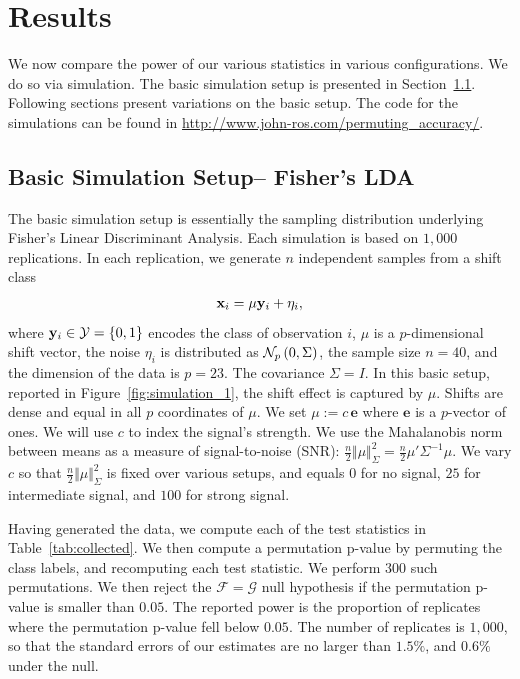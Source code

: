 \documentclass[]{bio}
\begin{document}
\section{Results}
\label{sec:results}
We now compare the power of our various statistics in various configurations. 
We do so via simulation.
The basic simulation setup is presented in Section~\ref{sec:simulation_details}.
Following sections present variations on the basic setup.
The \R code for the simulations can be found in \url{http://www.john-ros.com/permuting_accuracy/}.


\subsection{Basic Simulation Setup-- Fisher's LDA}
\label{sec:simulation_details}

The basic simulation setup is essentially the sampling distribution underlying Fisher's Linear Discriminant Analysis. 
Each simulation is based on $1,000$ replications. 
In each replication, we generate $n$ independent samples from a shift class 
\begin{align}
\label{eq:distribution}
\mathbf{x}_i = \mu \mathbf{y}_i + \eta_i,
\end{align}
where $\mathbf{y}_i \in \mathcal{Y}=\{ 0,1 \}$ encodes the class of observation $i$, $\mu$ is a $p$-dimensional shift vector, the noise $\eta_i$ is distributed as $\mathcal{N}_{p}\left(0,\Sigma\right)$, the sample size $n=40$, and the dimension of the data is $p=23$. 
The covariance $\Sigma=I$. 
In this basic setup, reported in Figure~\ref{fig:simulation_1}, the shift effect is captured by $\mu$. 
Shifts are dense and equal in all $p$ coordinates of $\mu$.
We set $\mu:=c \, \textbf{e}$ where $\textbf{e}$ is a $p$-vector of ones. 
We will use $c$ to index the signal's strength.
We use the Mahalanobis norm between means as a measure of signal-to-noise (SNR): 
$\frac{n}{2}\Vert \mu \Vert_\Sigma^2=\frac{n}{2} \mu' \Sigma^{-1} \mu$.
We vary $c$ so that $\frac{n}{2}\Vert \mu \Vert_\Sigma^2$ is fixed over various setups, and equals $0$ for no signal, $25$ for intermediate signal, and $100$ for strong signal.

Having generated the data, we compute each of the test statistics in Table~\ref{tab:collected}.
We then compute a permutation p-value by permuting the class labels, and recomputing each test statistic. 
We perform $300$ such permutations. 
We then reject the $\mathcal{F}=\mathcal{G}$ null hypothesis if the permutation p-value is smaller than $0.05$.
The reported power is the proportion of replicates where the permutation p-value fell below $0.05$.
The number of replicates is $1,000$, so that the standard errors of our estimates are no larger than $1.5\%$, and $0.6\%$ under the null. 
\end{document}
